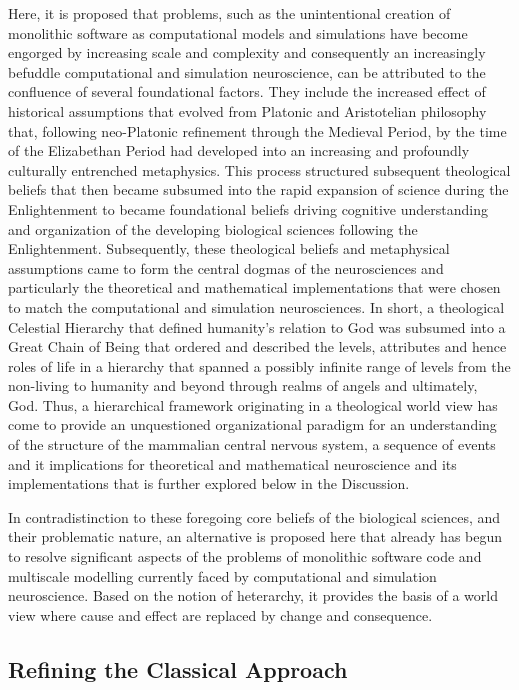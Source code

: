 \documentclass[11pt,3p,twocolumn]{JMN}
\begin{document}
Here, it is proposed that problems, such as the unintentional creation of monolithic software as computational models and simulations have become engorged by increasing scale and complexity and consequently an increasingly befuddle computational and simulation neuroscience, can be attributed to the confluence of several foundational factors. They include the increased effect of historical assumptions that evolved from Platonic and Aristotelian philosophy that, following neo-Platonic refinement through the Medieval Period, by the time of the Elizabethan Period had developed into an increasing and profoundly culturally entrenched metaphysics. This process structured subsequent theological beliefs that then became subsumed into the rapid expansion of science during the Enlightenment to became foundational beliefs driving cognitive understanding and organization of the developing biological sciences following the Enlightenment. Subsequently, these theological beliefs and metaphysical assumptions came to form the central dogmas of the neurosciences and particularly the theoretical and mathematical implementations that were chosen to match the computational and simulation neurosciences. In short, a theological Celestial Hierarchy that defined humanity's relation to God was subsumed into a Great Chain of Being that ordered and described the levels, attributes and hence roles of life in a hierarchy that spanned a possibly infinite range of levels from the non-living to humanity and beyond through realms of angels and ultimately, God. Thus, a hierarchical framework originating in a theological world view has come to provide an unquestioned organizational paradigm for an understanding of the structure of the mammalian central nervous system, a sequence of events and it implications for theoretical and mathematical neuroscience and its implementations that is further explored below in the Discussion.

In contradistinction to these foregoing core beliefs of the biological sciences, and their problematic nature, an alternative is proposed here that already has begun to resolve significant aspects of the problems of monolithic software code and multiscale modelling currently faced by computational and simulation neuroscience. Based on the notion of heterarchy, it provides the basis of a world view where cause and effect are replaced by change and consequence.

\subsection{Refining the Classical Approach}
\end{document}
